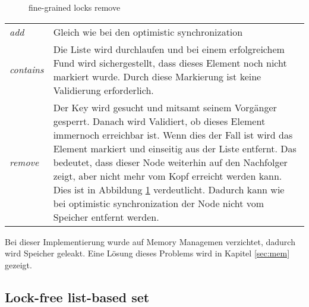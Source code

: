 \begin{figure}[H]
	\centering
	\caption{fine-grained locks remove}
	\label{tik:fine-grained-remove}
\end{figure}

\begin{table}[H]
    \begin{tabularx}{\textwidth}{lX}
        \textit{add} & Gleich wie bei den optimistic synchronization\\
		\textit{contains} & Die Liste wird durchlaufen und bei einem erfolgreichem Fund wird sichergestellt, dass dieses Element noch nicht markiert wurde.
		Durch diese Markierung ist keine Validierung erforderlich. \\
		\textit{remove} & Der Key wird gesucht und mitsamt seinem Vorgänger gesperrt. Danach wird Validiert, ob dieses Element immernoch erreichbar ist. 
		Wenn dies der Fall ist wird das Element markiert und einseitig aus der Liste entfernt. Das bedeutet, dass dieser Node weiterhin auf den Nachfolger 
		zeigt, aber nicht mehr vom Kopf erreicht werden kann. Dies ist in Abbildung \ref{tik:fine-grained-remove} verdeutlicht. Dadurch kann wie bei
		optimistic synchronization der Node nicht vom Speicher entfernt werden.\\
    \end{tabularx}
\end{table}

Bei dieser Implementierung wurde auf Memory Managemen verzichtet, dadurch wird Speicher geleakt.
Eine Lösung dieses Problems wird in Kapitel \ref{sec:mem} gezeigt.



\subsection{Lock-free list-based set}


